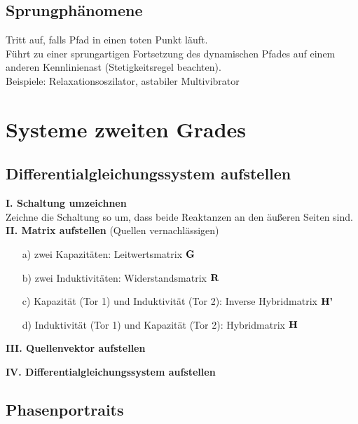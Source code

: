 \documentclass[fs, footer]{latex4ei}
\begin{document}
\begin{multicols*}{4}
    \subsection{Sprungphänomene}
    Tritt auf, falls Pfad in einen toten Punkt läuft.\\
    Führt zu einer sprungartigen Fortsetzung des dynamischen Pfades auf einem anderen Kennlinienast (Stetigkeitsregel beachten).\\
    Beispiele: Relaxationsoszilator, astabiler Multivibrator


    \section{Systeme zweiten Grades}
    \subsection{Differentialgleichungssystem aufstellen}
    \textbf{I. Schaltung umzeichnen}\\
    Zeichne die Schaltung so um, dass beide Reaktanzen an den äußeren Seiten sind.\\
    \textbf{II. Matrix aufstellen}
    (Quellen vernachlässigen)
    \begin{itemize}
        \item[a)] zwei Kapazitäten: Leitwertsmatrix $\textbf{G}$
        \item[b)] zwei Induktivitäten: Widerstandsmatrix $\textbf{R}$
        \item[c)] Kapazität (Tor 1) und Induktivität (Tor 2): Inverse Hybridmatrix $\textbf{H'}$
        \item[d)] Induktivität (Tor 1) und Kapazität (Tor 2): Hybridmatrix $\textbf{H}$
    \end{itemize}

    \textbf{III. Quellenvektor aufstellen}

    \textbf{IV. Differentialgleichungssystem aufstellen}
    \subsection{Phasenportraits}

\end{multicols*}
\end{document}
